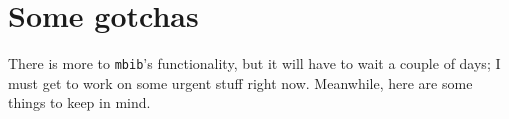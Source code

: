 \documentclass[10pt]{article}
\newcommand*{\mbib}{\texttt{mbib}\xspace}
\begin{document}
\begin{comment}
\section{Running \mbib}

The program runs inside a console window. Assuming you have put a start-up script into your shell's path, just open a shell window (e.g.\ \texttt{konsole} on KDE, or \texttt{xterm} on any X-based desktop) and run \texttt{mbib.sh}.

%
%




\subsection{The user interface}

\begin{itemize}
\item navigation (mouse, keyboard)
\item viewing and editing references
\item importing references
\item moving things around (using selections)
\item searching and filtering
\item using the clipboard (requires xclip)
\item 
\end{itemize}

\end{comment}


\section{Some gotchas}

There is more to \mbib's functionality, but it will have to wait a couple of days; I must get to work on some urgent stuff right now. Meanwhile, here are some things to keep in mind. 
\end{document}
